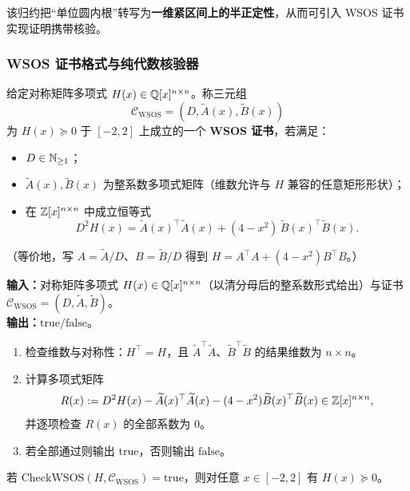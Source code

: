 该归约把“单位圆内根”转写为\textbf{一维紧区间上的半正定性}，从而可引入 WSOS 证书实现证明携带核验。

\subsubsection{WSOS 证书格式与纯代数核验器}

\begin{definition}\label{def:wsos-cert}
给定对称矩阵多项式 $H(x)\in\mathbb{Q}[x]^{n\times n}$。称三元组
$$
\mathcal{C}_{\mathrm{WSOS}}=(D,\widetilde{A}(x),\widetilde{B}(x))
$$
为 $H(x)\succeq 0$ 于 $[-2,2]$ 上成立的一个 \textbf{WSOS 证书}，若满足：
\begin{itemize}
  \item $D\in\mathbb{N}_{\ge 1}$；
  \item $\widetilde{A}(x),\widetilde{B}(x)$ 为整系数多项式矩阵（维数允许与 $H$ 兼容的任意矩形形状）；
  \item 在 $\mathbb{Z}[x]^{n\times n}$ 中成立恒等式
  $$
  D^2 H(x)=\widetilde{A}(x)^\top\widetilde{A}(x)+(4-x^2)\,\widetilde{B}(x)^\top\widetilde{B}(x).
  $$
\end{itemize}
（等价地，写 $A=\widetilde{A}/D$、$B=\widetilde{B}/D$ 得到 $H=A^\top A+(4-x^2)B^\top B$。）
\end{definition}

\begin{algorithm}\label{alg:check-wsos}
\textbf{输入：}对称矩阵多项式 $H(x)\in\mathbb{Q}[x]^{n\times n}$（以清分母后的整系数形式给出）与证书 $\mathcal{C}_{\mathrm{WSOS}}=(D,\widetilde{A},\widetilde{B})$。\\
\textbf{输出：}$\mathrm{true/false}$。
\begin{enumerate}
  \item 检查维数与对称性：$H^\top=H$，且 $\widetilde{A}^\top\widetilde{A}$、$\widetilde{B}^\top\widetilde{B}$ 的结果维数为 $n\times n$。
  \item 计算多项式矩阵
  $$
  R(x):=D^2H(x)-\widetilde{A}(x)^\top\widetilde{A}(x)-(4-x^2)\widetilde{B}(x)^\top\widetilde{B}(x)\in\mathbb{Z}[x]^{n\times n},
  $$
  并逐项检查 $R(x)$ 的全部系数为 $0$。
  \item 若全部通过则输出 $\mathrm{true}$，否则输出 $\mathrm{false}$。
\end{enumerate}
\end{algorithm}

\begin{proposition}\label{prop:wsos-soundness}
若 $\mathrm{CheckWSOS}(H,\mathcal{C}_{\mathrm{WSOS}})=\mathrm{true}$，则对任意 $x\in[-2,2]$ 有 $H(x)\succeq 0$。
\end{proposition}

